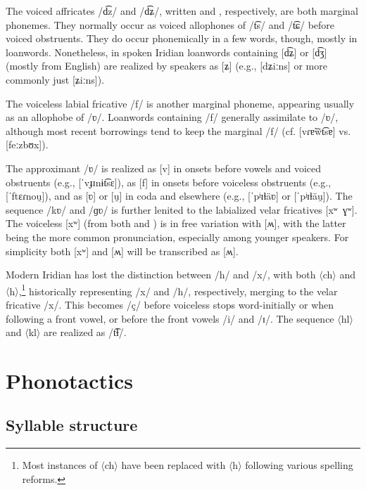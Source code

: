 The voiced affricates /d͡z/ and /d͡ʑ/, written  and , respectively, are both marginal phonemes. They normally occur as voiced allophones of  /t͡s/ and /t͡ɕ/ before voiced obstruents. They do occur phonemically in a few words, though, mostly in loanwords. Nonetheless, in spoken Iridian loanwords containing [d͡ʑ] or [d͡ʒ] (mostly from English) are realized by speakers as [ʑ] (e.g.,  [dʑiːns] or more commonly just [ʑiːns]).


The voiceless labial fricative /f/ is another marginal phoneme, appearing usually as an allophobe of /ʋ/. Loanwords containing /f/ generally assimilate to /ʋ/, although most recent borrowings tend to keep the marginal /f/ (cf.  [vɾɐ̃w̃t͡sɐ] vs.  [feːzbʊx]).

The approximant /ʋ/ is realized as [v] in onsets before vowels and voiced obstruents (e.g.,  [ˈvɟɪnɨt͡sɛ]), as [f] in onsets before voiceless obstruents (e.g.,  [ˈftɛɾnou̯]), and as [ʋ] or [u̯] in coda and elsewhere (e.g.,  [ˈpʲɪɫäʋ] or [ˈpʲɪɫäu̯]). The sequence /kʋ/ and /ɡʋ/ is further lenited to the labialized velar fricatives [xʷ~ɣʷ]. The voiceless [xʷ] (from both  and ) is in free variation with [ʍ], with the latter being the more common pronunciation, especially among younger speakers. For simplicity both [xʷ] and [ʍ] will be transcribed as [ʍ].

Modern Iridian has lost the distinction between /h/ and /x/, with both $\langle$ch$\rangle$ and $\langle$h$\rangle$,\footnote{Most instances of $\langle$ch$\rangle$ have been replaced with $\langle$h$\rangle$ following various spelling reforms.} historically representing /x/ and /h/, respectively, merging to the velar fricative /x/. This becomes /ç/ before voiceless stops word-initially or when following a front vowel, or before the front vowels /i/ and /ɪ/. The sequence $\langle$hl$\rangle$ and $\langle$kl$\rangle$ are realized as /t͡ɬ/.


\section{Phonotactics}\label{sec:phonotactics}

\subsection{Syllable structure}\label{sec:syllable-structure}

